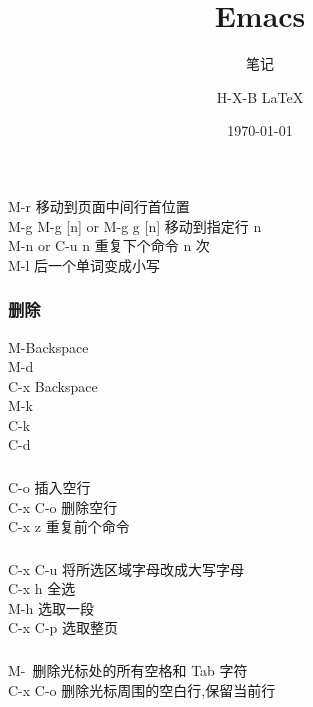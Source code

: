 \documentclass{beamer}
\begin{document}
\begin{CJK}{UTF8}{gkai}

  \title{Emacs}
  \subtitle{笔记}
  \author{H-X-B \LaTeX{} }
  \date{\today}

  \frame{\titlepage}

  \begin{frame}\frametitle{}
    M-r 移动到页面中间行首位置\\
    M-g M-g [n] or M-g g [n] 移动到指定行 n\\
    M-n or C-u n 重复下个命令 n 次\\
    M-l 后一个单词变成小写\\
  \end{frame}

  \begin{frame}\frametitle{删除}
    M-Backspace\\
    M-d\\
    C-x Backspace\\
    M-k\\
    C-k\\
    C-d \\

  \end{frame}

  \begin{frame}\frametitle{}
    C-o 插入空行\\
    C-x C-o 删除空行\\
    C-x z 重复前个命令\\
  \end{frame}

  \begin{frame}\frametitle{}
    C-x C-u 将所选区域字母改成大写字母\\
    C-x h 全选\\
    M-h 选取一段\\
    C-x C-p 选取整页\\
  \end{frame}

  \begin{frame}\frametitle{}
    M-\ 删除光标处的所有空格和 Tab 字符\\
    C-x C-o 删除光标周围的空白行,保留当前行\\
  \end{frame}


\end{CJK}
\end{document}
